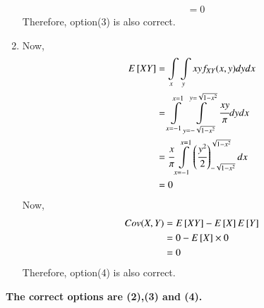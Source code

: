 \documentclass[journal,12pt,twocolumn]{IEEEtran}
\begin{document}
\begin{enumerate}
\begin{align}
    &=0
\end{align}
Therefore, option(3) is also correct.\\
\item
Now,
\begin{align}
    E{}\left[XY\right]&=\displaystyle\int\limits_{x}\displaystyle\int\limits_{y}xyf_{XY}(x,y)dydx\\
    &=\displaystyle\int\limits_{x=-1}^{x=1}\displaystyle\int\limits_{y=-\sqrt{1-x^2}}^{y=\sqrt{1-x^2}}\cfrac{xy}{\pi}dydx\\
    &=\cfrac{x}{\pi} \displaystyle\int\limits_{x=-1}^{x=1}\left(\cfrac{y^2}{2}\right)_{-\sqrt{1-x^2}}^{\sqrt{1-x^2}}dx\\
    &=0
\end{align}
Now,
\begin{align}
    Cov(X,Y)&=E{}\left[XY\right]-E{}\left[X\right]E{}\left[Y\right]\\
    &=0-E{}\left[X\right]\times0\\
    &=0
\end{align}
Therefore, option(4) is also correct.\\
\end{enumerate}
\textbf{The correct options are (2),(3) and (4).}
\end{document}
